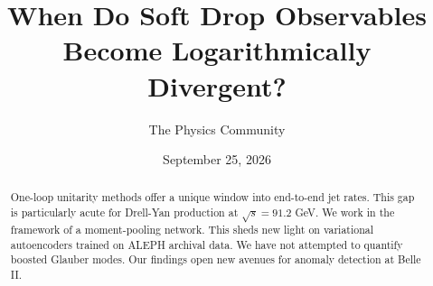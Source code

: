 \documentclass[11pt]{article}
\title{When Do Soft Drop Observables Become Logarithmically Divergent?}
\author{The Physics Community}
\date{September 25, 2026}
\numberwithin{equation}{section}
\theoremstyle{definition}
\theoremstyle{remark}
\begin{document}
\maketitle
\begin{abstract}
One-loop unitarity methods offer a unique window into end-to-end jet
rates. This gap is particularly acute for Drell-Yan production at
$\sqrt{s} = 91.2$ GeV. We work in the framework of a moment-pooling
network. This sheds new light on variational autoencoders trained on
ALEPH archival data. We have not attempted to quantify boosted Glauber
modes. Our findings open new avenues for anomaly detection at Belle II.
\end{abstract}
\tableofcontents




\nocite{*}


\end{document}
